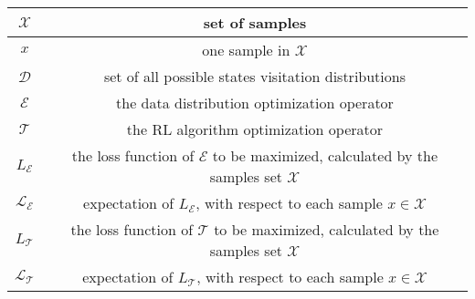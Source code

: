 \documentclass[nohyperref]{article}
\theoremstyle{plain}
\begin{document}
\begin{table}[!hb]
\begin{tabular}{|c |c| }
	    \hline
	    $\mathcal{X}$ & set of samples \\
	    \hline
	    $x$ & one sample in $\mathcal{X}$ \\
	    \hline
	    $\mathcal{D}$ & set of all possible states visitation distributions \\
	    \hline
	    $\mathcal{E}$ & the data distribution optimization operator \\
	    \hline
	    $\mathcal{T}$ & the RL algorithm optimization operator \\
	    \hline
	    $L_{\mathcal{E}}$ & \makecell[c]{the loss function of $\mathcal{E}$ to be maximized, \\ calculated by the samples set $\mathcal{X}$ }\\
	    \hline
	    $\mathcal{L}_\mathcal{E}$ & \makecell[c]{expectation of $L_{\mathcal{E}}$, \\ with respect to each sample $x \in \mathcal{X}$} \\
	    \hline
	    $L_{\mathcal{T}}$ & \makecell[c]{the loss function of $\mathcal{T}$ to be maximized,\\  calculated by the samples set $\mathcal{X}$} \\
	    \hline
	    $\mathcal{L}_\mathcal{T}$ & \makecell[c]{expectation of $L_{\mathcal{T}}$, \\ with respect to each sample $x \in \mathcal{X}$} \\
		\hline
	\end{tabular} 
\end{table}
\end{document}
